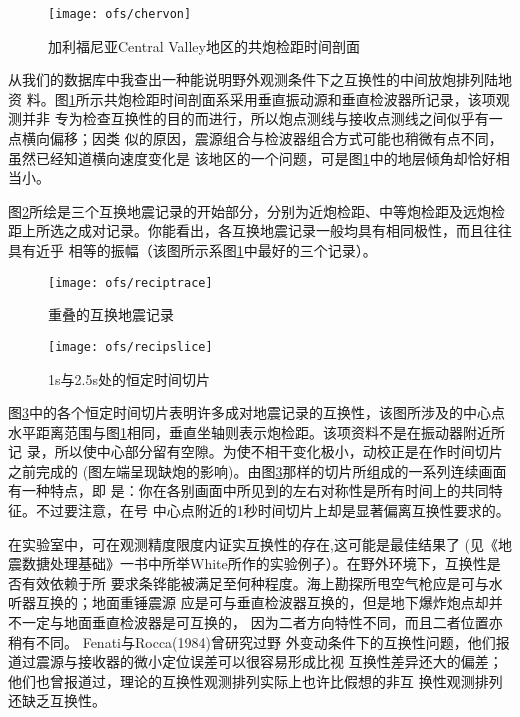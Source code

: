 \begin{figure}[H]
\centering
\texttt{[image: ofs/chervon]}
\caption[chervon]{加利福尼亚Central Valley地区的共炮检距时间剖面}
\label{fig:ofs/chervon}
\end{figure}

从我们的数据库中我查出一种能说明野外观测条件下之互换性的中间放炮排列陆地资
料。图\ref{fig:ofs/chervon}所示共炮检距时间剖面系采用垂直振动源和垂直检波器所记录，该项观测并非
专为检查互换性的目的而进行，所以炮点测线与接收点测线之间似乎有一点横向偏移；因类
似的原因，震源组合与检波器组合方式可能也稍微有点不同，虽然已经知道横向速度变化是
该地区的一个问题，可是图\ref{fig:ofs/chervon}中的地层倾角却恰好相当小。

图\ref{fig:ofs/reciptrace}所绘是三个互换地震记录的开始部分，分别为近炮检距、中等炮检距及远炮检
距上所选之成对记录。你能看出，各互换地震记录一般均具有相同极性，而且往往具有近乎
相等的振幅（该图所示系图\ref{fig:ofs/chervon}中最好的三个记录）。
\begin{figure}[H]
\centering
\texttt{[image: ofs/reciptrace]}
\caption[reciptrace]{重叠的互换地震记录}
\label{fig:ofs/reciptrace}
\end{figure}

\begin{figure}[H]
\centering
\texttt{[image: ofs/recipslice]}
\caption[recipslice]{1s与2.5s处的恒定时间切片}
\label{fig:ofs/recipslice}
\end{figure}

图\ref{fig:ofs/recipslice}中的各个恒定时间切片表明许多成对地震记录的互换性，该图所涉及的中心点
水平距离范围与图\ref{fig:ofs/chervon}相同，垂直坐轴则表示炮检距。该项资料不是在振动器附近所记
录，所以使中心部分留有空隙。为使不相干变化极小，动校正是在作时间切片之前完成的
(图左端呈现缺炮的影响)。由图\ref{fig:ofs/recipslice}那样的切片所组成的一系列连续画面有一种特点，即
是：你在各别画面中所见到的左右对称性是所有时间上的共同特征。不过要注意，在号
中心点附近的1秒时间切片上却是显著偏离互换性要求的。

在实验室中，可在观测精度限度内证实互换性的存在,这可能是最佳结果了
(见《地震数搪处理基础》一书中所举White所作的实验例子）。在野外环境下，互换性是否有效依赖于所
要求条铧能被满足至何种程度。海上勘探所甩空气枪应是可与水听器互换的；地面重锤震源
应是可与垂直检波器互换的，但是地下爆炸炮点却并不一定与地面垂直检波器是可互换的，
因为二者方向特性不同，而且二者位置亦稍有不同。 Fenati与Rocca(1984)曾研究过野
外变动条件下的互换性问题，他们报道过震源与接收器的微小定位误差可以很容易形成比视
互换性差异还大的偏差；他们也曾报道过，理论的互换性观测排列实际上也许比假想的非互
换性观测排列还缺乏互换性。

